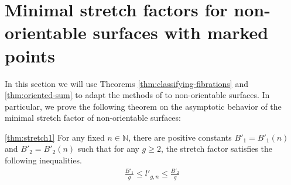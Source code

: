 \section{Minimal stretch factors for non-orientable surfaces with marked points}
\label{sec:application}

In this section we will use Theorems \ref{thm:classifying-fibrations} and \ref{thm:oriented-sum} to adapt the methods of \cite{yazdi2018pseudo} to non-orientable surfaces. In particular, we prove the following theorem on the asymptotic behavior of the minimal stretch factor of non-orientable surfaces:
\begin{manualtheorem}
  {\ref{thm:stretch1}}
  For any fixed $n \in \mathbb{N}$, there are positive constants $B'_1 = B'_1(n)$ and $B'_2 = B'_2(n)$ such that
  for any $g \geq 2$, the stretch factor satisfies the following inequalities.
  \begin{align*}
    \frac{B'_1}{g} \leq l'_{g,n} \leq \frac{B'_2}{g}
  \end{align*}
\end{manualtheorem}




